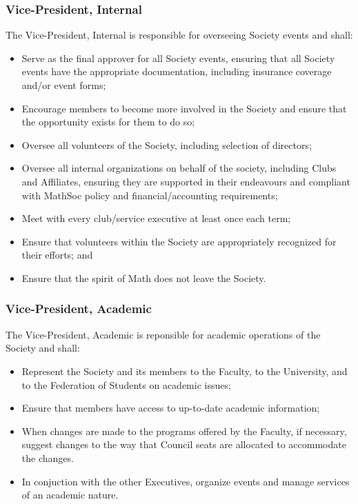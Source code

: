\subsubsection{Vice-President, Internal}
The Vice-President, Internal is responsible for overseeing Society events and
shall:
\begin{itemize}
  \item Serve as the final approver for all Society events, ensuring that all Society events have the appropriate documentation,
    including insurance coverage and/or event forms;
  \item Encourage members to become more involved in the Society and ensure that
    the opportunity exists for them to do so;
  \item Oversee all volunteers of the Society, including selection of directors;
    \item Oversee all internal organizations on behalf of the society, including Clubs and Affiliates, ensuring they are supported in their endeavours and compliant with MathSoc policy and financial/accounting requirements;
  \item Meet with every club/service executive at least once each term;
  \item Ensure that volunteers within the Society are appropriately recognized for their efforts; and
  \item Ensure that the spirit of Math does not leave the Society.

\end{itemize}

\subsubsection{Vice-President, Academic}
The Vice-President, Academic is reponsible for academic operations of the
Society and shall:
\begin{itemize}
  \item Represent the Society and its members to the Faculty, to the University,
    and to the Federation of Students on academic issues;
  \item Ensure that members have access to up-to-date academic information;
  \item When changes are made to the programs offered by the Faculty, if
    necessary, suggest changes to the way that Council seats are allocated to
    accommodate the changes.
  \item In conjuction with the other Executives, organize events and manage
    services of an academic nature.
\end{itemize}

